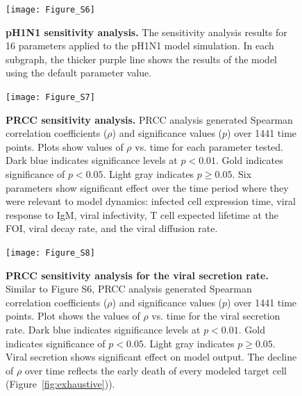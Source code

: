\documentclass[preprint,10pt,authoryear]{article}
\begin{document}
\begin{landscape}
\begin{figure}[ht!]
\begin{center}
	\texttt{[image: Figure\_S6]}
	\caption{\textbf{pH1N1 sensitivity analysis.} The sensitivity analysis results for 16 parameters applied to the pH1N1 model simulation.  In each subgraph, the thicker purple line shows the results of the model using the default parameter value.}
	\label{fig:psensitivity}
\end{center}
\end{figure}

\begin{figure}[ht!]
\begin{center}
	\texttt{[image: Figure\_S7]}
	\caption{\textbf{PRCC sensitivity analysis.} PRCC analysis generated Spearman correlation coefficients ($\rho$) and significance values ($p$) over 1441 time points.  Plots show values of $\rho$ vs. time for each parameter tested.  Dark blue indicates significance levels at $p < 0.01$.  Gold indicates significance of $p < 0.05$.  Light gray indicates $p \geq 0.05$.  Six parameters show significant effect over the time period where they were relevant to model dynamics: infected cell expression time, viral response to IgM, viral infectivity, T cell expected lifetime at the FOI, viral decay rate, and the viral diffusion rate.}
	\label{fig:prcc}
\end{center}
\end{figure}

\end{landscape}

\begin{figure}[ht!]
\begin{center}
	\texttt{[image: Figure\_S8]}
	\caption{\textbf{PRCC sensitivity analysis for the viral secretion rate.} Similar to Figure S6, PRCC analysis generated Spearman correlation coefficients ($\rho$) and significance values ($p$) over 1441 time points.  Plot shows the values of $\rho$ vs. time for the viral secretion rate.  Dark blue indicates significance levels at $p < 0.01$.  Gold indicates significance of $p < 0.05$.  Light gray indicates $p \geq 0.05$.  Viral secretion shows significant effect on model output.  The decline of $\rho$ over time reflects the early death of every modeled target cell (Figure~\ref{fig:exhaustive})).}
	\label{fig:vsec}
\end{center}
\end{figure}
\end{document}
